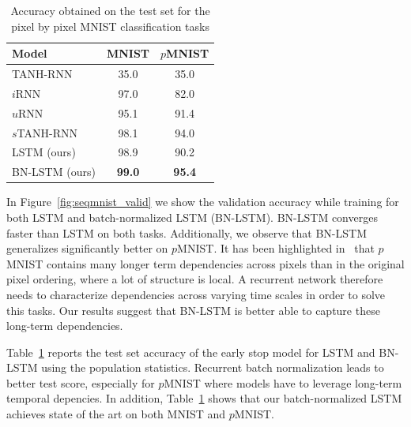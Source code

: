 \documentclass{article} %
\begin{document}
\begin{table}[!hb]
\center
\begin{tabular}{@{}lcc@{}}
  \toprule
  \bf Model & \bf MNIST & \bf $p$MNIST \\
  \midrule
  TANH-RNN~\cite{le2015simple} & 35.0 & 35.0\\
  $i$RNN~\cite{le2015simple} & 97.0 & 82.0\\
  $u$RNN~\cite{urnn} & 95.1 & 91.4\\
  $s$TANH-RNN~\cite{zhang2016architectural} & 98.1 & 94.0\\
  \midrule
  LSTM (ours) & 98.9 & 90.2\\
  BN-LSTM (ours) & \textbf{99.0} & \textbf{95.4}\\
  \bottomrule
\end{tabular}
\caption{Accuracy obtained on the test set for the pixel by pixel MNIST classification tasks}
\label{tab:seqmnist_test}

\end{table}

In Figure~\ref{fig:seqmnist_valid} we show the validation accuracy while training for both LSTM and batch-normalized LSTM (BN-LSTM).
BN-LSTM converges faster than LSTM on both tasks.
Additionally, we observe that BN-LSTM generalizes significantly better on $p$MNIST.
It has been highlighted in~\cite{urnn} that
$p$MNIST contains many longer term dependencies across pixels than in
the original pixel ordering, where a lot of structure is local.
A recurrent network therefore needs to characterize dependencies across varying time scales in order to solve this tasks.
Our results suggest that BN-LSTM is better able to capture these long-term dependencies.

Table~\ref{tab:seqmnist_test} reports the test set accuracy of the early stop model for LSTM and BN-LSTM using the population statistics.
Recurrent batch normalization leads to better test score, especially for $p$MNIST where models have to leverage long-term temporal depencies.
In addition, Table~\ref{tab:seqmnist_test} shows that our batch-normalized LSTM achieves state of the art on both MNIST and $p$MNIST.
\end{document}
